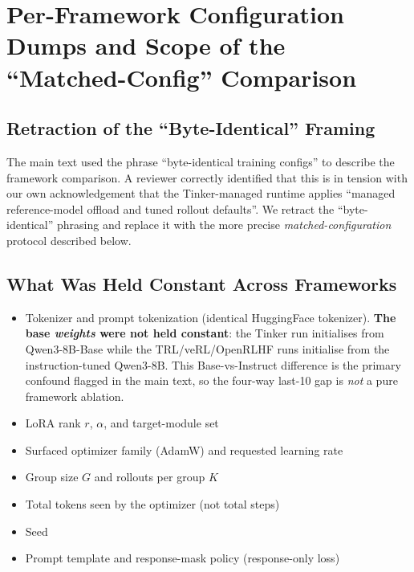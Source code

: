\section{Per-Framework Configuration Dumps and Scope of the ``Matched-Config'' Comparison}
\label{sec:appendix:framework-configs}

\subsection{Retraction of the ``Byte-Identical'' Framing}

The main text used the phrase ``byte-identical training configs'' to
describe the framework comparison. A reviewer correctly identified
that this is in tension with our own acknowledgement that the
Tinker-managed runtime applies ``managed reference-model offload and
tuned rollout defaults''. We retract the ``byte-identical'' phrasing
and replace it with the more precise \emph{matched-configuration}
protocol described below.

\subsection{What Was Held Constant Across Frameworks}

\begin{itemize}[leftmargin=1.2em,itemsep=1pt]
  \item Tokenizer and prompt tokenization (identical HuggingFace tokenizer).
        \textbf{The base \emph{weights} were not held constant}: the Tinker run
        initialises from Qwen3-8B-Base while the TRL/veRL/OpenRLHF runs
        initialise from the instruction-tuned Qwen3-8B. This Base-vs-Instruct
        difference is the primary confound flagged in the main text, so the
        four-way last-10 gap is \emph{not} a pure framework ablation.
  \item LoRA rank $r$, $\alpha$, and target-module set
  \item Surfaced optimizer family (AdamW) and requested learning rate
  \item Group size $G$ and rollouts per group $K$
  \item Total tokens seen by the optimizer (not total steps)
  \item Seed
  \item Prompt template and response-mask policy (response-only loss)
\end{itemize}

